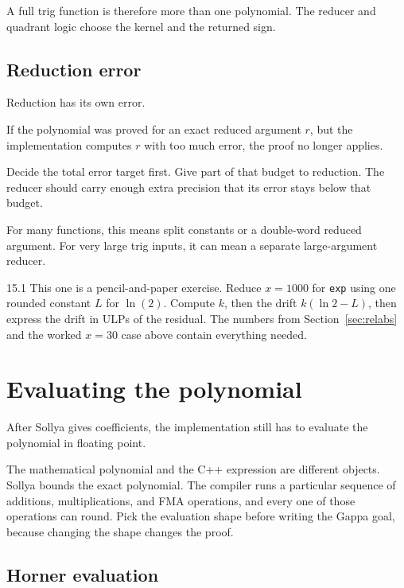 \documentclass[manuscript, nonacm]{acmart}
\begin{document}
    A full trig function is therefore more than one polynomial. The reducer and
    quadrant logic choose the kernel and the returned sign.

    \subsection{Reduction error}

    Reduction has its own error.

    If the polynomial was proved for an exact reduced argument $r$, but the
    implementation computes $r$ with too much error, the proof no longer applies.

    Decide the total error target first. Give part of that budget to reduction.
    The reducer should carry enough extra precision that its error stays below
    that budget.

    For many functions, this means split constants or a double-word reduced
    argument. For very large trig inputs, it can mean a separate large-argument
    reducer.

    \begin{checkpoint}{15.1}
        This one is a pencil-and-paper exercise. Reduce $x = 1000$ for
        \texttt{exp} using one rounded constant $L$ for $\ln(2)$. Compute $k$,
        then the drift $k(\ln 2 - L)$, then express the drift in ULPs of the
        residual. The numbers from Section~\ref{sec:relabs} and the worked
        $x = 30$ case above contain everything needed.
    \end{checkpoint}



    \section{Evaluating the polynomial}

    After Sollya gives coefficients, the implementation still has to evaluate
    the polynomial in floating point.

    The mathematical polynomial and the C++ expression are different objects.
    Sollya bounds the exact polynomial. The compiler runs a particular sequence
    of additions, multiplications, and FMA operations, and every one of those
    operations can round. Pick the evaluation shape before writing the Gappa goal,
    because changing the shape changes the proof.

    \subsection{Horner evaluation}
\end{document}
